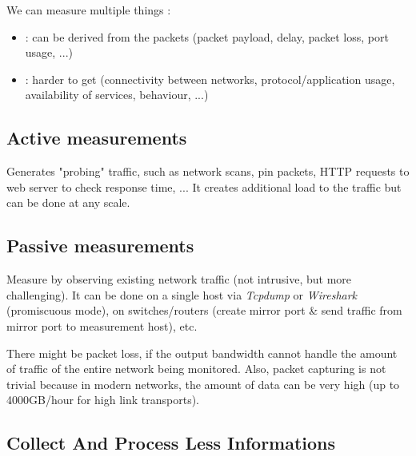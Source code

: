 We can measure multiple things :
\begin{itemize}
    \item {} : can be derived from the packets (packet payload, delay, packet loss, port usage, ...)
    \item {} : harder to get (connectivity between networks, protocol/application usage, availability of services, behaviour, ...)
\end{itemize}

\subsection{Active measurements}

Generates "probing" traffic, such as network scans, pin packets, HTTP requests to web server to check response time, ... It creates additional load to the traffic but can be done at any scale.

\subsection{Passive measurements}

Measure by observing existing network traffic (not intrusive, but more challenging). It can be done on a single host via \textit{Tcpdump} or \textit{Wireshark} (promiscuous mode), on switches/routers (create mirror port \& send traffic from mirror port to measurement host), etc.

There might be packet loss, if the output bandwidth cannot handle the amount of traffic of the entire network being monitored. Also, packet capturing is not trivial because in modern networks, the amount of data can be very high (up to 4000GB/hour for high link transports).

\subsection{Collect And Process Less Informations}


